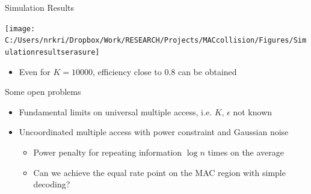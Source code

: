 %
\begin{frame}{Simulation Results}
\begin{center}
\texttt{[image: C:/Users/nrkri/Dropbox/Work/RESEARCH/Projects/MACcollision/Figures/Simulationresultserasure]}
\end{center}
\begin{itemize}
\item Even for $K=10000$, efficiency close to 0.8 can be obtained
\end{itemize}
\end{frame}
\begin{frame}{Some open problems}
\begin{itemize}
\item Fundamental limits on universal multiple access, i.e. $K$, $\epsilon$ not known
\item Uncoordinated multiple access with power constraint and Gaussian noise
    \begin{itemize}
    \item Power penalty for repeating information $\log n$ times on the average
    \item Can we achieve the equal rate point on the MAC region with simple decoding?
    \end{itemize}
\end{itemize}
\end{frame}
